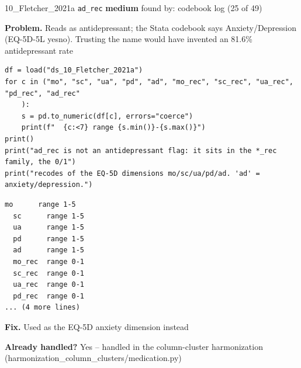 \documentclass[9pt, t, handout]{beamer}
\newcommand{\ans}[1]{\textcolor{structure.fg}{#1}}
\begin{document}
\begin{frame}[fragile]{10\_Fletcher\_2021a \quad \texttt{ad\_rec}}
  {\scriptsize\textcolor{blue!55!black}{\textbf{medium}} \quad
   found by: codebook log \quad (25 of 49)}
  \vspace{3pt}

  {\footnotesize \textbf{Problem.} Reads as antidepressant; the Stata codebook says Anxiety/Depression (EQ-5D-5L yesno). Trusting the name would have invented an 81.6\% antidepressant rate}
  \vspace{4pt}

  \begin{Verbatim}[fontsize=\tiny, frame=single, framesep=2pt, label=\tiny reproduce]
df = load("ds_10_Fletcher_2021a")
for c in ("mo", "sc", "ua", "pd", "ad", "mo_rec", "sc_rec", "ua_rec", "pd_rec", "ad_rec"
    ):
    s = pd.to_numeric(df[c], errors="coerce")
    print(f"  {c:<7} range {s.min()}-{s.max()}")
print()
print("ad_rec is not an antidepressant flag: it sits in the *_rec family, the 0/1")
print("recodes of the EQ-5D dimensions mo/sc/ua/pd/ad. 'ad' = anxiety/depression.")
  \end{Verbatim}
  \begin{Verbatim}[fontsize=\tiny, frame=single, framesep=2pt, label=\tiny output]
mo      range 1-5
  sc      range 1-5
  ua      range 1-5
  pd      range 1-5
  ad      range 1-5
  mo_rec  range 0-1
  sc_rec  range 0-1
  ua_rec  range 0-1
  pd_rec  range 0-1
... (4 more lines)
  \end{Verbatim}
  \vspace{2pt}

  {\footnotesize \textbf{Fix.} Used as the EQ-5D anxiety dimension instead}
  \vspace{2pt}

  {\footnotesize \textbf{Already handled?} \ans{Yes} -- handled in the column-cluster harmonization
   (harmonization\_column\_clusters/medication.py)}
\end{frame}
\end{document}
